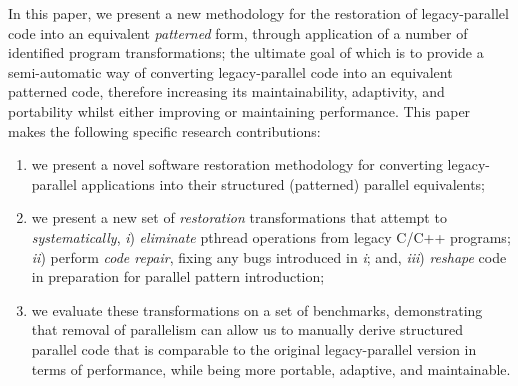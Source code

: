 In this paper, we present a new methodology for the restoration of legacy-parallel code into an equivalent \emph{patterned} form, through application of a number of identified program transformations; the ultimate goal of which is to provide a semi-automatic way of converting legacy-parallel code into an equivalent patterned code, therefore increasing its maintainability, adaptivity, and portability 
whilst either improving or maintaining performance.
%
This paper makes the following specific research contributions:
%
\begin{enumerate}
    \item we present a novel software restoration methodology for converting legacy-parallel applications into their structured (patterned) parallel equivalents;
    \item we present a new set of \emph{restoration} transformations that attempt to \emph{systematically}, \emph{i}) \emph{eliminate} pthread operations from legacy C/C++ programs; \emph{ii}) perform \emph{code repair}, fixing any bugs introduced in \emph{i}; and, \emph{iii}) \emph{reshape} code in preparation for parallel pattern introduction;
    \item we evaluate these transformations on a set of benchmarks, demonstrating that removal of parallelism can allow us to manually derive structured parallel code that is comparable to the original legacy-parallel version in terms of performance, while being more portable, adaptive, and maintainable.
\end{enumerate}

